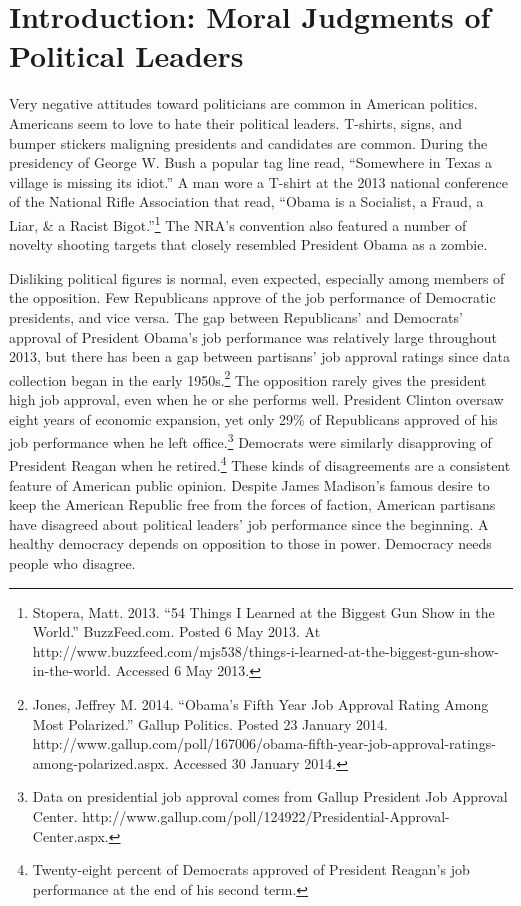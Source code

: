 %
%
%
%

\chapter{Introduction: Moral Judgments of Political Leaders}\label{ch:intro}
Very negative attitudes toward politicians are common in American politics. Americans seem to love to hate their political leaders. T-shirts, signs, and bumper stickers maligning presidents and candidates are common. During the presidency of George W. Bush a popular tag line read, ``Somewhere in Texas a village is missing its idiot.'' A man wore a T-shirt at the 2013 national conference of the National Rifle Association that read, ``Obama is a Socialist, a Fraud, a Liar, \& a Racist Bigot.''\footnote{Stopera, Matt. 2013. ``54 Things I Learned at the Biggest Gun Show in the World.'' BuzzFeed.com. Posted 6 May 2013. At http://www.buzzfeed.com/mjs538/things-i-learned-at-the-biggest-gun-show-in-the-world. Accessed 6 May 2013.} The NRA's convention also featured a number of novelty shooting targets that closely resembled President Obama as a zombie.

Disliking political figures is normal, even expected, especially among members of the opposition. Few Republicans approve of the job performance of Democratic presidents, and vice versa. The gap between Republicans' and Democrats' approval of President Obama's job performance was relatively large throughout 2013, but there has been a gap between partisans' job approval ratings since data collection began in the early 1950s.\footnote{Jones, Jeffrey M. 2014. ``Obama's Fifth Year Job Approval Rating Among Most Polarized.'' Gallup Politics. Posted 23 January 2014. http://www.gallup.com/poll/167006/obama-fifth-year-job-approval-ratings-among-polarized.aspx. Accessed 30 January 2014.} The opposition rarely gives the president high job approval, even when he or she performs well. President Clinton oversaw eight years of economic expansion, yet only 29\% of Republicans approved of his job performance when he left office.\footnote{Data on presidential job approval comes from Gallup President Job Approval Center. http://www.gallup.com/poll/124922/Presidential-Approval-Center.aspx.} Democrats were similarly disapproving of President Reagan when he retired.\footnote{Twenty-eight percent of Democrats approved of President Reagan's job performance at the end of his second term.} These kinds of disagreements are a consistent feature of American public opinion. Despite James Madison's famous desire to keep the American Republic free from the forces of faction, American partisans have disagreed about political leaders' job performance since the beginning. A healthy democracy depends on opposition to those in power. Democracy needs people who disagree.

